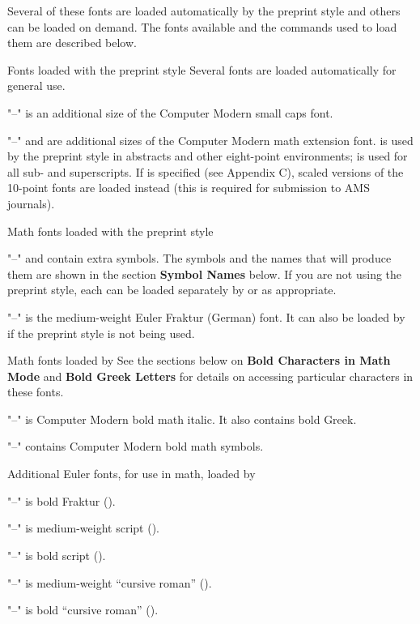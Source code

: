 Several of these fonts are loaded automatically by the preprint
style and others can be loaded on demand.  The fonts available and the
commands used to load them are described below.

\subsubhead Fonts loaded with the preprint style
\endsubsubhead
Several fonts are loaded automatically for general use.
\roster
\item"--"  is an additional size of the Computer Modern
        small caps font.
\item"--"  and  are additional sizes of the
        Computer Modern math extension font.   is used by the
        preprint style in abstracts and other eight-point environments;
         is used for all sub- and superscripts.
\endroster
If  is specified (see Appendix C), scaled versions of the
10-point fonts are loaded instead (this is required for submission to
AMS journals).


\subsubhead Math fonts loaded with the preprint style
\endsubsubhead
\roster
\item"--"  and  contain extra symbols.  The symbols
        and the names that will produce them are shown in the section
        {\bf Symbol Names} below.  If you are not using the preprint style,
        each can be loaded separately by  or 
        as appropriate.
\item"--"  is the medium-weight Euler Fraktur (German) font.
        It can also be loaded by  if the preprint style is not
        being used.
\endroster


\subsubhead Math fonts loaded by 
\endsubsubhead
See the sections below on {\bf Bold Characters in Math Mode} and
{\bf Bold Greek Letters} for details on accessing particular characters
in these fonts.
\roster
\item"--"  is Computer Modern bold math italic.
        It also contains bold Greek.
\item"--"  contains Computer Modern bold math symbols.
\endroster


\subsubhead Additional Euler fonts, for use in math, loaded by
\tt\endsubsubhead
\roster
\item"--"  is bold Fraktur ().
\item"--"  is medium-weight script ().
\item"--"  is bold script ().
\item"--"  is medium-weight ``cursive roman'' ().
\item"--"  is bold ``cursive roman'' ().
\endroster


